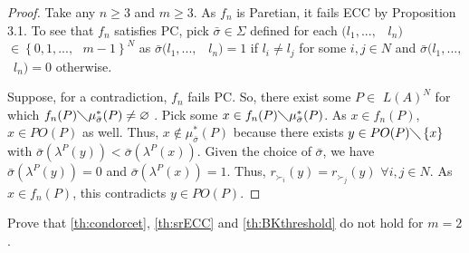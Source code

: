 \documentclass[version=3.21, pagesize, twoside=off, bibliography=totoc, DIV=calc, fontsize=12pt, a4paper]{scrartcl}
\begin{document}
\begin{proof}
Take any $n\geq 3$ and $m\geq 3.$ As $f_{n}$ is Paretian, it fails ECC by
Proposition 3.1. To see that $f_{n}$ satisfies PC, pick $\bar{\sigma }%
\in \Sigma $ defined for each $(l_{1},...,$ \ $l_{n})$ $\in \left\{ 0,1,...,%
\text{ }m-1\right\} ^{N}$ as $\bar{\sigma }(l_{1},...,$ \ $l_{n})=1$ if 
$l_{i}\neq l_{j}$ for some $i,j\in N$ and $\bar{\sigma }(l_{1},...,$ \ $%
l_{n})=0$ otherwise. 

Suppose, for a contradiction, $f_{n}$ fails PC. So,
there exist some $P\in $ $L(A)^{N}$ for which $f_{n}(P)\diagdown \mu _{%
\bar{\sigma }}^{\ast }(P)\neq \varnothing $ . Pick some $x\in
f_{n}(P)\diagdown \mu _{\bar{\sigma }}^{\ast }(P)$. As $x\in f_{n}(P)$, 
$x\in PO(P)$ as well. Thus, $x\notin \mu _{\bar{\sigma }}^{\ast }(P)$
because there exists $y\in PO(P)\diagdown \left\{ x\right\} $ with  $%
\bar{\sigma }(\lambda^{P}(y))<\bar{\sigma }(\lambda^{P}(x))$.
Given the choice of $\bar{\sigma }$, we have  $\bar{\sigma }%
(\lambda^{P}(y))=0$ and $\bar{\sigma }(\lambda^{P}(x))=1$. Thus, $%
r_{\succ _{i}}(y)=r_{\succ _{j}}(y)$ $\forall i,j\in N$. As $x\in f_{n}(P)$,
this contradicts $y\in PO(P)$.

\end{proof}

\begin{remark}
	Prove that \cref{th:condorcet}, \cref{th:srECC}  and \cref{th:BKthreshold} do not hold for $m=2$.
\end{remark}
\end{document}
